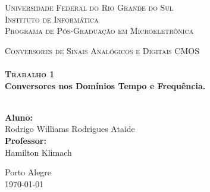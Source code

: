 \begin{titlepage}
\begin{center}

\textsc{\Large Universidade Federal do Rio Grande do Sul}\\
\textsc{\Large Instituto de Informática}\\
\textsc{\Large Programa de Pós-Graduação em Microeletrônica}\\
\vspace{3.5cm}

\textsc{\Large Conversores de Sinais Analógicos e Digitais CMOS}\\[3cm]

\HRule \\[0.5cm]

{\Large\bfseries\textsc{\Large Trabalho 1}\\}
{\Large \bfseries Conversores nos Domínios Tempo e Frequência. \\[0.5cm]}

\HRule \\[3cm]

\large\textbf{Aluno:}\\
Rodrigo Williams Rodrigues Ataide\\[1cm]

\large\textbf{Professor:}\\
Hamilton Klimach\\[1cm]

\vfill

\large{Porto Alegre}\\
{\large \today}

\end{center}
\end{titlepage}